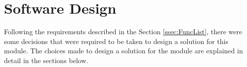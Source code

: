 \newpage
\chapter{Software Design}
    Following the requirements described in the Section \ref{ssec:FuncList}, there were
    some decisions that were required to be taken to design a solution for this module. The choices
    made to design a solution for the module are explained in detail in the sections below.
    
    
    
    
    
        




